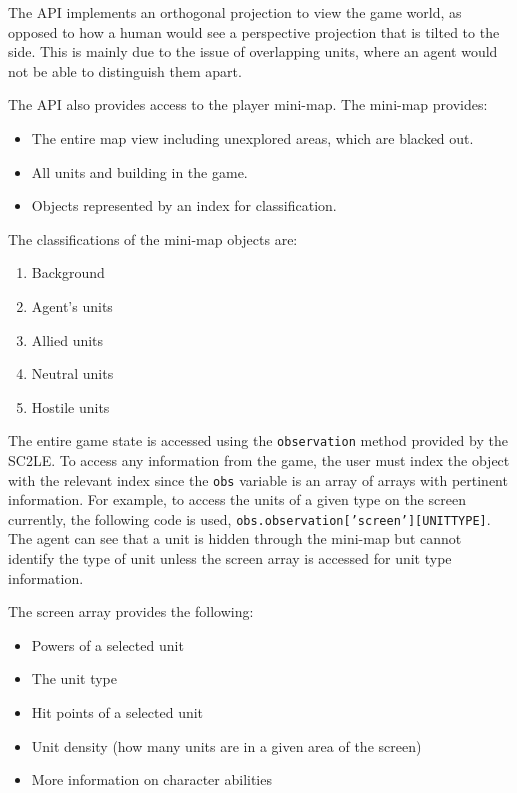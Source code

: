 The API implements an orthogonal projection to view the game world, as opposed
to how a human would see a perspective projection that is tilted to the side.
This is mainly due to the issue of overlapping units, where an agent would not
be able to distinguish them apart.

The API also provides access to the player mini-map. The mini-map provides:

\begin{itemize}
    \item The entire map view including unexplored areas, which are blacked out.
    \item All units and building in the game.
    \item Objects represented by an index for classification.
\end{itemize}

The classifications of the mini-map objects are:
\begin{enumerate}
    \item Background
    \item Agent's units
    \item Allied units
    \item Neutral units
    \item Hostile units
\end{enumerate}

The entire game state is accessed using the \texttt{observation} method provided
by the SC2LE\@. To access any information from the game, the user must index the
object with the relevant index since the \texttt{obs} variable is an array of
arrays with pertinent information. For example, to access the units of a given
type on the screen currently, the following code is used,
\texttt{obs.observation['screen'][UNITTYPE]}. The agent can see that a unit is
hidden through the mini-map but cannot identify the type of unit unless the
screen array is accessed for unit type information.

The screen array provides the following:

\begin{itemize}
    \item Powers of a selected unit
    \item The unit type
    \item Hit points of a selected unit
    \item Unit density (how many units are in a given area of the screen)
    \item More information on character abilities
\end{itemize}

